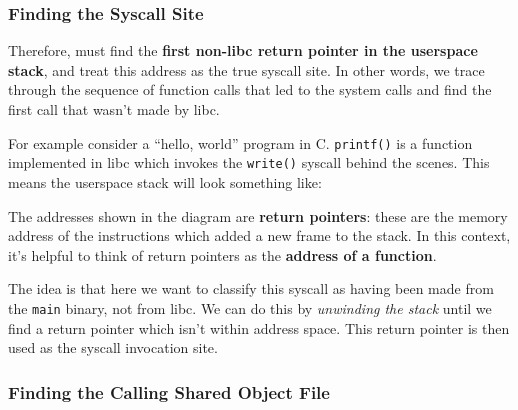 \subsubsection{Finding the Syscall Site}\label{subsubsec:find_syscall}

Therefore, \af must find the \textbf{first non-\ac{libc} return pointer in the
userspace stack}, and treat this address as the true syscall site. In other
words, we trace through the sequence of function calls that led to the system
calls and find the first call that wasn't made by libc.

For example consider a ``hello, world'' program in C. \texttt{printf()} is a 
function implemented in \ac{libc} which invokes the \texttt{write()} syscall
behind the scenes. This means the userspace stack will look something like:




%
%
%
%

The addresses shown in the diagram are \textbf{return pointers}: these are the
memory address of the instructions which added a new frame to the stack. In this
context, it's helpful to think of return pointers as the \textbf{address of a function}.

The idea is that here we want to classify this syscall as having been made from
the \texttt{main} binary, not from \ac{libc}. We can do this by
\textit{unwinding the stack} until we find a return pointer which isn't within
 address space. This return pointer is then used as the syscall
invocation site.


\subsubsection{Finding the Calling Shared Object File}\label{subsubsec:find_so}

